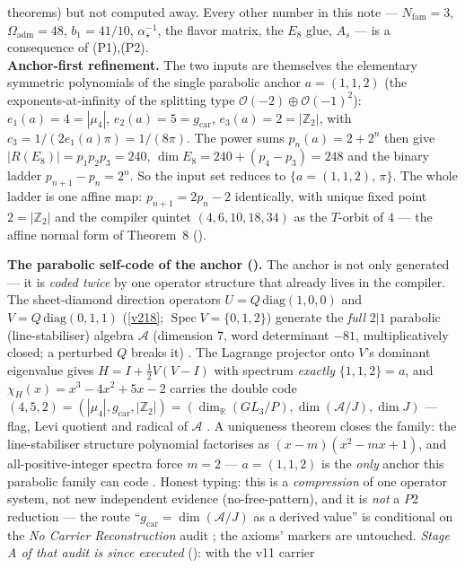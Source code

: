 \documentclass[11pt,a4paper]{article}
\newcommand{\gcar}{g_{\mathrm{car}}}
\newcommand{\Nfam}{N_{\mathrm{fam}}}
\newcommand{\Oadm}{\Omega_{\mathrm{adm}}}
\newcommand{\cthree}{c_3}
\newcommand{\ainv}{\alpha^{-1}_\star}
\newcommand{\Z}{\mathbb{Z}}
\theoremstyle{definition}
\begin{document}
\begin{keybox}
theorems) but not computed away. Every other number in this note --- $\Nfam=3$, $\Oadm=48$,
$b_1=41/10$, $\ainv$, the flavor matrix, the $E_8$ glue, $A_s$ --- is a consequence of (P1),(P2).
\smallskip\\
\noindent\textbf{Anchor-first refinement.} The two inputs are themselves the elementary symmetric
polynomials of the single parabolic anchor $a=(1,1,2)$ (the exponents-at-infinity of the splitting type
$\mathcal O(-2)\oplus\mathcal O(-1)^2$): $e_1(a)=4=|\mu_4|$, $e_2(a)=5=\gcar$, $e_3(a)=2=|\Z_2|$, with
$\cthree=1/(2e_1(a)\pi)=1/(8\pi)$. The power sums $p_n(a)=2+2^n$ then give $|R(E_8)|=p_1p_2p_3=240$,
$\dim E_8=240+(p_4{-}p_3)=248$ and the binary ladder $p_{n+1}{-}p_n=2^n$. So the input set reduces to
$\{a=(1,1,2),\,\pi\}$.   The whole ladder is one affine map: $p_{n+1}=2p_n-2$
identically, with unique fixed point $2=|\Z_2|$ and the compiler quintet $(4,6,10,18,34)$ as the $T$-orbit
of $4$ --- the affine normal form of Theorem~8 ().
\par\smallskip\noindent\textbf{The parabolic self-code of the anchor
().} The anchor is not only
generated --- it is \emph{coded twice} by one operator structure that
already lives in the compiler.  The sheet-diamond direction operators
$U=Q\,\mathrm{diag}(1,0,0)$ and $V=Q\,\mathrm{diag}(0,1,1)$ (\vref{v218};
$\operatorname{Spec}V=\{0,1,2\}$) generate the \emph{full} $2|1$ parabolic
(line-stabiliser) algebra $\mathcal A$ (dimension $7$, word determinant
$-81$, multiplicatively closed; a perturbed $Q$ breaks it) \mE.  The
Lagrange projector onto $V$'s dominant eigenvalue gives
$H=I+\tfrac12V(V-I)$ with spectrum \emph{exactly} $\{1,1,2\}=a$, and
$\chi_H(x)=x^3-4x^2+5x-2$ carries the double code
$(4,5,2)=(|\mu_4|,\gcar,|\Z_2|)=(\dim_{\mathbb R}(GL_3/P),\dim(\mathcal
A/J),\dim J)$ --- flag, Levi quotient and radical of $\mathcal A$ \mE.  A
uniqueness theorem closes the family: the line-stabiliser structure
polynomial factorises as $(x-m)(x^2-mx+1)$, and all-positive-integer
spectra force $m=2$ --- $a=(1,1,2)$ is the \emph{only} anchor this
parabolic family can code \mE.  Honest typing: this is a
\emph{compression} of one operator system, not new independent evidence
(no-free-pattern), and it is \emph{not} a $P2$ reduction --- the route
``$\gcar=\dim(\mathcal A/J)$ as a derived value'' is conditional on the
\emph{No Carrier Reconstruction} audit \mO; the axioms' markers are
untouched.  \emph{Stage A of that audit is since executed}
(): with the v11 carrier

\end{keybox}
\end{document}
